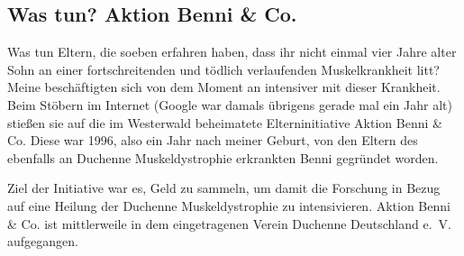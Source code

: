 \documentclass[fontsize=14pt,a4paper,headinclude,DIV=calc,automark]{scrbook}
\begin{document}
\subsection{Was tun? Aktion Benni \& Co.}

Was tun Eltern, die soeben erfahren haben, dass ihr nicht einmal vier Jahre alter Sohn an einer fortschreitenden und tödlich verlaufenden Muskelkrankheit litt? Meine beschäftigten sich von dem Moment an intensiver mit dieser Krankheit. Beim Stöbern im Internet (Google war damals übrigens gerade mal ein Jahr alt) stießen sie auf die im Westerwald beheimatete Elterninitiative Aktion Benni \& Co. Diese war 1996, also ein Jahr nach meiner Geburt, von den Eltern des ebenfalls an Duchenne Muskeldystrophie erkrankten Benni gegründet worden.

Ziel der Initiative war es, Geld zu sammeln, um damit die Forschung in Bezug auf eine Heilung der Duchenne Muskeldystrophie zu intensivieren. Aktion Benni \& Co. ist mittlerweile in dem eingetragenen Verein Duchenne Deutschland e.~V. aufgegangen.
\end{document}
